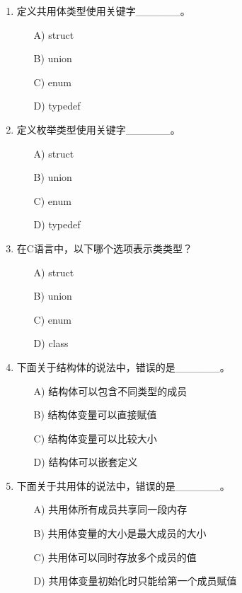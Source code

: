 \documentclass[a4paper,12pt]{article}
\begin{document}
\begin{enumerate}
	\item 定义共用体类型使用关键字\_\_\_\_\_\_。
	      \begin{enumerate}
		      \item[A)] struct
		      \item[B)] union
		      \item[C)] enum
		      \item[D)] typedef
	      \end{enumerate}
	      \vspace{0.3cm}

	\item 定义枚举类型使用关键字\_\_\_\_\_\_。
	      \begin{enumerate}
		      \item[A)] struct
		      \item[B)] union
		      \item[C)] enum
		      \item[D)] typedef
	      \end{enumerate}
	      \vspace{0.3cm}

	\item 在C语言中，以下哪个选项表示类类型？
	      \begin{enumerate}
		      \item[A)] struct
		      \item[B)] union
		      \item[C)] enum
		      \item[D)] class
	      \end{enumerate}
	      \vspace{0.3cm}

	\item 下面关于结构体的说法中，错误的是\_\_\_\_\_\_。
	      \begin{enumerate}
		      \item[A)] 结构体可以包含不同类型的成员
		      \item[B)] 结构体变量可以直接赋值
		      \item[C)] 结构体变量可以比较大小
		      \item[D)] 结构体可以嵌套定义
	      \end{enumerate}
	      \vspace{0.3cm}

	\item 下面关于共用体的说法中，错误的是\_\_\_\_\_\_。
	      \begin{enumerate}
		      \item[A)] 共用体所有成员共享同一段内存
		      \item[B)] 共用体变量的大小是最大成员的大小
		      \item[C)] 共用体可以同时存放多个成员的值
		      \item[D)] 共用体变量初始化时只能给第一个成员赋值
	      \end{enumerate}
	      \vspace{0.3cm}


\end{enumerate}
\end{document}

